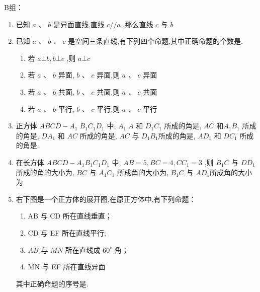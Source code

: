 B组：
\begin{enumerate}
    \item 已知 $ a $ 、 $ b $ 是异面直线,直线 $ c//a $ ,那么直线 $ c $ 与 $ b $ 

    \item 已知 $ {a} $ 、 $ {b} $ 、 $ {c} $ 是空间三条直线,有下列四个命题,其中正确命题的个数是.
    \begin{enumerate}
        \item 若 $ a\bot b,b\bot c $ ,则 $ a\bot c $
        \item 若 $ a $ 、 $ b $ 异面, $ b $ 、 $ c $ 异面,则 $ a $ 、 $ c $ 异面
        \item 若 $ a $ 、 $ b $ 共面, $ b $ 、 $ c $ 共面,则 $ a $ 、 $ c $ 共面
        \item 若 $ a $ 、 $ b $ 平行, $ b $ 、 $ c $ 平行,则 $ a $ 、 $ c $ 平行
    \end{enumerate}

    \item 正方体 $ {{ABCD}} - {{A}}_{1}{{\;B}}_{1}{{C}}_{1}{{D}}_{1} $ 中, $ {{A}}_{1}{\;A} $ 和 $ {{D}}_{1}{{C}}_{1} $ 所成的角是, $ {{AC}} $ 和$ {{A}}_{1}{{B}}_{1} $ 所成的角是, $ {{{DA}}}_{1} $ 和 $ {{AC}} $ 所成的角是, $ {{AC}} $ 与 $ {{D}}_{1}{{B}}_{1} $所成的角是, $ {{{AD}}}_{1} $ 和 $ {{{DC}}}_{1} $ 所成的角是.
    
    \item 在长方体 $ {ABCD} - {A}_{1}{B}_{1}{C}_{1}{D}_{1} $ 中, $ {AB} = 5,{BC} = 4,{C{C}_{1}} = 3 $ ,则 $ {B}_{1}C $ 与 $ D{D}_{1} $ 所成的角的大小为, $ {BC} $ 与 $ {A}_{1}{C}_{1} $ 所成角的大小为, $ {B}_{1}C $ 与 $ A{D}_{1} $所成角的大小为

    \item 右下图是一个正方体的展开图,在原正方体中,有下列命题：
    \begin{enumerate}
        \item AB 与 CD 所在直线垂直；
        \item CD 与 EF 所在直线平行;
        \item $ {{AB}} $ 与 $ {{MN}} $ 所在直线成 $ {60}^{ \circ  } $ 角；
        \item MN 与 EF 所在直线异面
    \end{enumerate}
    其中正确命题的序号是.
    \begin{center}


\end{center}
\end{enumerate}
